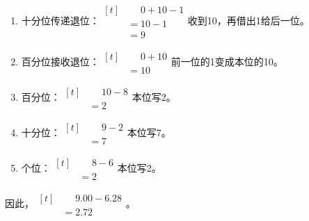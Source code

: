 {\begin{enumerate}[leftmargin=1.7em,itemsep=5pt,topsep=0pt]
\item 十分位传递退位：\(\begin{aligned}[t]&\phantom{={}}0+10-1\\&=10-1\\&=9\end{aligned}\)\quad 收到10，再借出1给后一位。
\item 百分位接收退位：\(\begin{aligned}[t]&\phantom{={}}0+10\\&=10\end{aligned}\)\quad 前一位的1变成本位的10。
\item 百分位：\(\begin{aligned}[t]&\phantom{={}}10-8\\&=2\end{aligned}\)\quad 本位写2。
\item 十分位：\(\begin{aligned}[t]&\phantom{={}}9-2\\&=7\end{aligned}\)\quad 本位写7。
\item 个位：\(\begin{aligned}[t]&\phantom{={}}8-6\\&=2\end{aligned}\)\quad 本位写2。
\end{enumerate}
\par\smallskip
因此，\(\begin{aligned}[t]&\phantom{={}}9.00-6.28\\&=2.72\end{aligned}\)。
\par\medskip

}
